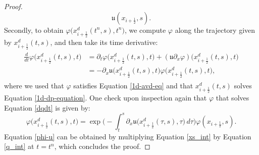 \documentclass[preprint,12pt]{elsarticle}
\begin{document}
\begin{linenumbers}
\begin{proof}
\begin{equation}
	\mathfrak{u}(x_{i+\frac{1}{2}},s).
\end{equation}
Secondly, to obtain $\varphi\big(x_{i+\frac{1}{2}}^d(t^n,s),t^n\big)$, we compute $\varphi$ along the trajectory given by $x_{i+\frac{1}{2}}^d(t,s)$, and then take its time derivative:
\begin{align}
	\label{dqdt}
	\begin{split}
		\frac{d}{dt}\varphi\big( x_{i+\frac{1}{2}}^d(t,s),t\big) &= 
		{\partial_t}\varphi\big( x_{i+\frac{1}{2}}^d(t,s),t\big)+
		(\mathfrak{u}{\partial_x } 
		\varphi)\big(x_{i+\frac{1}{2}}^d(t,s),t\big) \\
		&= -{\partial_x}{\mathfrak{u}}\big( x_{i+\frac{1}{2}}^d(t,s),t\big) \varphi \big(x_{i+\frac{1}{2}}^d(t,s),t\big),
	\end{split}
\end{align}
where we used that $\varphi$ satisfies Equation \eqref{1d-avd-eq} and that $x_{i+\frac{1}{2}}^d(t,s)$
solves Equation \eqref{1d-dp-equation}.
One check upon inspection again that $\varphi$ that solves Equation \eqref{dqdt} is given by:
\begin{equation}
	\label{q_int}
	\varphi\big( x_{i+\frac{1}{2}}^d(t,s),t\big) = 
	\exp{\bigg(-\int_{t}^{s} {\partial_x}{\mathfrak{u}}\big( x_{i+\frac{1}{2}}^d(\tau,s),\tau\big)  \,d\tau \bigg)}
	\varphi(x_{i+\frac{1}{2}},s).
\end{equation}
Equation \eqref{phi-u} can be obtained by multiplying Equation \eqref{xs_int} by Equation \eqref{q_int} at $t=t^n$, which concludes the proof.
\end{proof}

\end{linenumbers}
   
  






\end{document}
